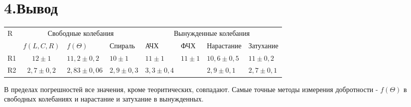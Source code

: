\documentclass[a4paper,12pt]{article}
\begin{document}
\section*{4.Вывод}

\begin{table}[!ht]
\begin{tabular}{|l|cll|llll|}
\hline
\multirow{2}{*}{R} & \multicolumn{3}{c|}{Свободные колебания}                                                                     & \multicolumn{4}{c|}{Вынужденные колебания}                                                                                                                                 \\ \cline{2-8} 
                   & \multicolumn{1}{c|}{$f(L, C, R)$} & \multicolumn{1}{l|}{$f(\Theta)$}                   & Спираль                  & \multicolumn{1}{l|}{АЧХ}                      & \multicolumn{1}{l|}{ФЧХ}                   & \multicolumn{1}{l|}{Нарастание}                  & Затухание                  \\ \hline
R1                 & \multicolumn{1}{c|}{$12\pm1$}      & \multicolumn{1}{l|}{$11,2\pm0,2$}  & $10\pm1$    & \multicolumn{1}{l|}{$11\pm1$}    & \multicolumn{1}{l|}{$11\pm1$} & \multicolumn{1}{l|}{$10,6 \pm 0,5$} & $11 \pm 0,2$  \\ \hline
R2                 & \multicolumn{1}{c|}{$2,7\pm0,2$}       & \multicolumn{1}{l|}{$2,83\pm0,06$} & $2,9\pm0,3$ & \multicolumn{1}{l|}{$3,3\pm0,4$} & \multicolumn{1}{l|}{}                      & \multicolumn{1}{l|}{$2,9\pm0,1$}  & $2,7\pm0,1$ \\ \hline
\end{tabular}
\end{table}

В пределах погрешностей все значения, кроме теоритических, совпадают. Самые точные методы измерения добротности - $f(\Theta)$ в свободных колебаниях и нарастание и затухание в вынужденных.
\end{document}

